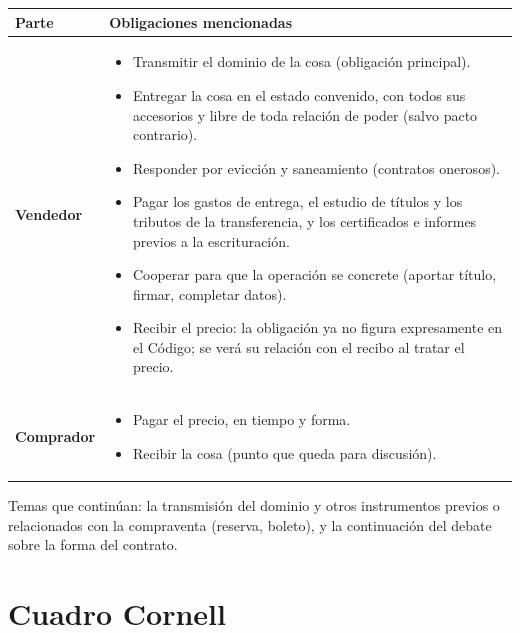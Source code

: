 \documentclass[12pt,oneside]{book}
\begin{document}
\begin{table}[H]
\centering
\small
\begin{tabularx}{\textwidth}{>{\raggedright\arraybackslash}p{} >{\raggedright\arraybackslash}X}
\toprule
\textbf{Parte} & \textbf{Obligaciones mencionadas} \\
\midrule
\textbf{Vendedor} &
\begin{itemize}[nosep,leftmargin=*]
    \item Transmitir el dominio de la cosa (obligación principal).
    \item Entregar la cosa en el estado convenido, con todos sus accesorios y libre de toda relación de poder (salvo pacto contrario).
    \item Responder por evicción y saneamiento (contratos onerosos).
    \item Pagar los gastos de entrega, el estudio de títulos y los tributos de la transferencia, y los certificados e informes previos a la escrituración.
    \item Cooperar para que la operación se concrete (aportar título, firmar, completar datos).
    \item Recibir el precio: la obligación ya no figura expresamente en el Código; se verá su relación con el recibo al tratar el precio.
\end{itemize} \\
\midrule
\textbf{Comprador} &
\begin{itemize}[nosep,leftmargin=*]
    \item Pagar el precio, en tiempo y forma.
    \item Recibir la cosa (punto que queda para discusión).
\end{itemize} \\
\bottomrule
\end{tabularx}
\end{table}

\begin{note}
Temas que continúan: la transmisión del dominio y otros instrumentos previos o relacionados con la compraventa (reserva, boleto), y la continuación del debate sobre la forma del contrato.
\end{note}

\section{Cuadro Cornell}
\end{document}
